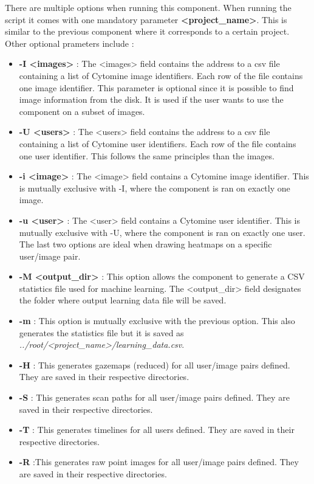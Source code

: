 \documentclass[a4paper,11pt]{report}
\numberwithin{figure}{chapter} %
\begin{document}
    There are multiple options when running this component.
    When running the script it comes with one mandatory parameter \textbf{<project\_name>}.
    This is similar to the previous component where it corresponds to a certain project.
    Other optional prameters include :
    \begin{itemize}
        \item[\textbullet] \textbf{-I <images>} : The <images> field contains the address to a csv file containing a list of Cytomine image identifiers.
        Each row of the file contains one image identifier.
        This parameter is optional since it is possible to find image information from the disk.
        It is used if the user wants to use the component on a subset of images.
        \item[\textbullet] \textbf{-U <users>} : The <users> field contains the address to a csv file containing a list of Cytomine user identifiers.
        Each row of the file contains one user identifier.
        This follows the same principles than the images.
        \item[\textbullet] \textbf{-i <image>} : The <image> field contains a Cytomine image identifier.
        This is mutually exclusive with -I, where the component is ran on exactly one image.
        \item[\textbullet] \textbf{-u <user>} : The <user> field contains a Cytomine user identifier.
        This is mutually exclusive with -U, where the component is ran on exactly one user.
        The last two options are ideal when drawing heatmaps on a specific user/image pair.
        \item[\textbullet] \textbf{-M <output\_dir>} : This option allows the component to generate a CSV statistics file used for machine learning.
        The <output\_dir> field designates the folder where output learning data file will be saved.
        \item[\textbullet] \textbf{-m} : This option is mutually exclusive with the previous option.
        This also generates the statistics file but it is saved as \textit{../root/<project\_name>/learning\_data.csv}.
        \item[\textbullet] \textbf{-H} : This generates gazemaps (reduced) for all user/image pairs defined.
        They are saved in their respective directories.
        \item[\textbullet] \textbf{-S} : This generates scan paths for all user/image pairs defined.
        They are saved in their respective directories.
        \item[\textbullet] \textbf{-T} : This generates timelines for all users defined.
        They are saved in their respective directories.
        \item[\textbullet] \textbf{-R} :This generates raw point images for all user/image pairs defined.
        They are saved in their respective directories.
    \end{itemize}
\end{document}
